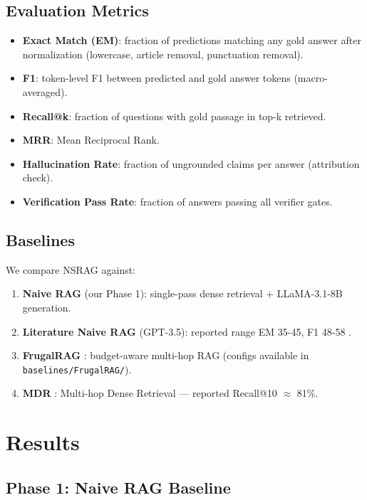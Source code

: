 \documentclass[conference]{IEEEtran}
\begin{document}
\subsection{Evaluation Metrics}
\begin{itemize}
    \item \textbf{Exact Match (EM)}: fraction of predictions matching any gold answer after normalization (lowercase, article removal, punctuation removal).
    \item \textbf{F1}: token-level F1 between predicted and gold answer tokens (macro-averaged).
    \item \textbf{Recall@k}: fraction of questions with gold passage in top-k retrieved.
    \item \textbf{MRR}: Mean Reciprocal Rank.
    \item \textbf{Hallucination Rate}: fraction of ungrounded claims per answer (attribution check).
    \item \textbf{Verification Pass Rate}: fraction of answers passing all verifier gates.
\end{itemize}

\subsection{Baselines}
We compare NSRAG against:
\begin{enumerate}
    \item \textbf{Naive RAG} (our Phase 1): single-pass dense retrieval + LLaMA-3.1-8B generation.
    \item \textbf{Literature Naive RAG} (GPT-3.5): reported range EM 35-45, F1 48-58 \cite{yang2018hotpotqa}.
    \item \textbf{FrugalRAG} \cite{frugalrag2024}: budget-aware multi-hop RAG (configs available in \texttt{baselines/FrugalRAG/}).
    \item \textbf{MDR} \cite{xiong2021mdr}: Multi-hop Dense Retrieval — reported Recall@10 $\approx$ 81\%.
\end{enumerate}

\section{Results}

\subsection{Phase 1: Naive RAG Baseline}
\end{document}
